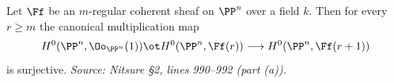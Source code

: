 \begin{lemma}
  \label{lem:castelnuovo-surjective}
  Let $\Ff$ be an $m$-regular coherent sheaf on $\PP^n$ over a field $k$. Then
  for every $r\ge m$ the canonical multiplication map
  \[
    H^0(\PP^n,\Oo_{\PP^n}(1)) \ot H^0(\PP^n,\Ff(r))
      \longrightarrow H^0(\PP^n,\Ff(r+1))
  \]
  is surjective.
  \textit{Source: Nitsure \S2, lines 990--992 (part (a)).}
\end{lemma}

